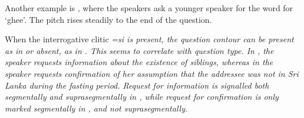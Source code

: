 Another example is , where the speakers ask a younger speaker for the word for `ghee'. The pitch rises steadily to the end of the question.





When the interrogative clitic \em =si \em is present, the question contour can be present as in  or absent, as in . This seems to correlate with question type. In , the speaker requests information about the existence of siblings, whereas in  the speaker requests confirmation of her assumption that the addressee was not in Sri Lanka during the fasting period. Request for information is signalled both segmentally and suprasegmentally in , while request for confirmation is only marked segmentally in , and not suprasegmentally.


 \\


